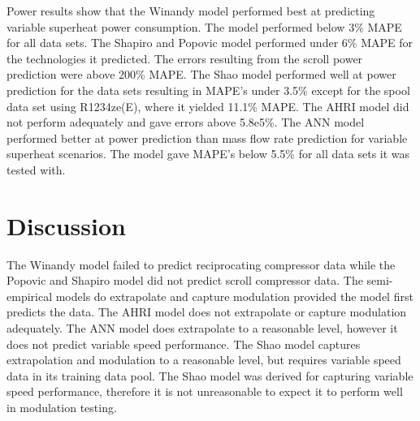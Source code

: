 \documentclass[preprint,11pt,authoryear]{elsarticle}
\begin{document}
\begin{table}[h]
\caption{Power results for variable superheat scenarios.}
\label{Tab:vspr_pwr_results}
\begin{center}
\end{center}
\end{table}

Power results show that the Winandy model performed best at predicting variable superheat power consumption. The model performed below 3\% MAPE for all data sets. The Shapiro and Popovic model performed under 6\% MAPE for the technologies it predicted. The errors resulting from the scroll power prediction were above 200\% MAPE. The Shao model performed well at power prediction for the data sets resulting in MAPE's under 3.5\% except for the spool data set using R1234ze(E), where it yielded 11.1\% MAPE. The AHRI model did not perform adequately and gave errors above 5.8e5\%. The ANN model performed better at power prediction than mass flow rate prediction for variable superheat scenarios. The model gave MAPE's below 5.5\% for all data sets it was tested with. 


\section{Discussion}

The Winandy model failed to predict reciprocating compressor data while the Popovic and Shapiro model did not predict scroll compressor data. The semi-empirical models do extrapolate and capture modulation provided the model first predicts the data. The AHRI model does not extrapolate or capture modulation adequately. The ANN model does extrapolate to a reasonable level, however it does not predict variable speed performance. The Shao model captures extrapolation and modulation to a reasonable level, but requires variable speed data in its training data pool. The Shao model was derived for capturing variable speed performance, therefore it is not unreasonable to expect it to perform well in modulation testing.
\end{document}
